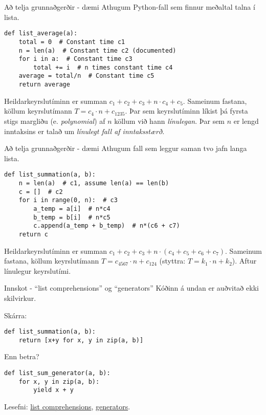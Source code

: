 \documentclass{beamer}
\begin{document}
\begin{frame}[fragile]{Að telja grunnaðgerðir - dæmi}
Athugum Python-fall sem finnur meðaltal talna í lista.

\begin{verbatim}
def list_average(a):
    total = 0  # Constant time c1
    n = len(a)  # Constant time c2 (documented)
    for i in a:  # Constant time c3
        total += i  # n times constant time c4
    average = total/n  # Constant time c5
    return average
\end{verbatim}

Heildarkeyrslutíminn er summan $c_1 + c_2 + c_3 + n\cdot c_4 + c_5$. Sameinum fastana, köllum keyrslutímann $T = c_4 \cdot n + c_{1235}$. Þar sem keyrslutíminn líkist þá fyrsta stigs margliðu (e. \emph{polynomial}) af $n$ köllum við hann \emph{línulegan}. Þar sem $n$ er lengd inntaksins er talað um \emph{línulegt fall af inntaksstærð.}
\end{frame}

\begin{frame}[fragile]{Að telja grunnaðgerðir - dæmi}
Athugum fall sem leggur saman tvo jafn langa lista.
\begin{verbatim}
def list_summation(a, b):
    n = len(a)  # c1, assume len(a) == len(b)
    c = []  # c2
    for i in range(0, n):  # c3
        a_temp = a[i]  # n*c4
        b_temp = b[i]  # n*c5
        c.append(a_temp + b_temp)  # n*(c6 + c7)
    return c
\end{verbatim}

Heildarkeyrslutíminn er summan $c_1 + c_2 + c_3 + n\cdot (c_4 + c_5 + c_6 + c_7)$. Sameinum fastana, köllum keyrslutímann $T = c_{4567}\cdot n + c_{124}$ (styttra: $T = k_1\cdot n + k_2$). Aftur línulegur keyrslutími.
\end{frame}

\begin{frame}[fragile]{Innskot - ``list comprehensions'' og ``generators''}
Kóðinn á undan er auðvitað ekki skilvirkur.

Skárra:
\begin{verbatim}
def list_summation(a, b):
    return [x+y for x, y in zip(a, b)]
\end{verbatim}

Enn betra?
\begin{verbatim}
def list_sum_generator(a, b):
    for x, y in zip(a, b):
        yield x + y
\end{verbatim}

Lesefni: \href{https://docs.python.org/2/tutorial/datastructures.html#list-comprehensions}{list comprehensions}, \href{http://freepythontips.wordpress.com/2013/09/29/the-python-yield-keyword-explained/}{generators}.
\end{frame}
\end{document}
